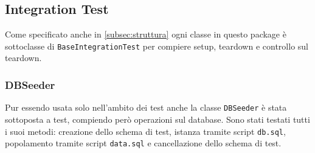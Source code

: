 \subsection{Integration Test}
Come specificato anche in \ref{subsec:struttura} ogni classe in questo package è sottoclasse di \texttt{BaseIntegrationTest} per compiere setup, teardown e controllo sul teardown.
\subsubsection{DBSeeder}
Pur essendo usata solo nell'ambito dei test anche la classe \texttt{DBSeeder} è stata sottoposta a test, compiendo però operazioni sul database. Sono stati testati tutti i suoi metodi: creazione dello schema di test, istanza tramite script \texttt{db.sql}, popolamento tramite script \texttt{data.sql} e cancellazione dello schema di test.
